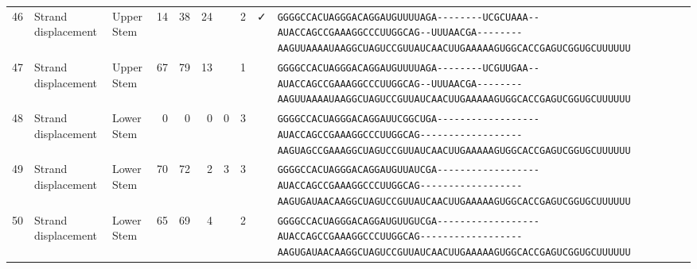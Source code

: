 \begin{tabular}{rllrrrrrcl}
 46 & Strand displacement & Upper Stem & 14 & 38 & 24 &  & 2 & ✓ &
 \color{ucsfdarkgrey}\verb|GGGGCCACUAGGGACAGGAU|\color{ucsforange}\verb|GUUUUA|\color{ucsfblue}\verb|GA--------UCGCUAAA--|\color{ucsfpurple}\verb|AUACCAGCCGAAAGGCCCUUGGCAG|\color{ucsfblue}\verb|--UUUAACGA--------AAGU|\color{ucsforange}\verb|UAAAAUAA|\color{ucsfnavy}\verb|GGCUAGUCC|\color{ucsforange}\verb|GUUAUCA|\color{ucsfteal}\verb|ACUUGAAAAAGU|\color{ucsforange}\verb|GGCACCGAGUCGGUGCUUUUUU| \\

 47 & Strand displacement & Upper Stem & 67 & 79 & 13 &  & 1 &  &
 \color{ucsfdarkgrey}\verb|GGGGCCACUAGGGACAGGAU|\color{ucsforange}\verb|GUUUUA|\color{ucsfblue}\verb|GA--------UCGUUGAA--|\color{ucsfpurple}\verb|AUACCAGCCGAAAGGCCCUUGGCAG|\color{ucsfblue}\verb|--UUUAACGA--------AAGU|\color{ucsforange}\verb|UAAAAUAA|\color{ucsfnavy}\verb|GGCUAGUCC|\color{ucsforange}\verb|GUUAUCA|\color{ucsfteal}\verb|ACUUGAAAAAGU|\color{ucsforange}\verb|GGCACCGAGUCGGUGCUUUUUU| \\

 48 & Strand displacement & Lower Stem & 0 & 0 & 0 & 0 & 3 &  &
 \color{ucsfdarkgrey}\verb|GGGGCCACUAGGGACAGGAU|\color{ucsforange}\verb|UCGGCU|\color{ucsfblue}\verb|GA------------------|\color{ucsfpurple}\verb|AUACCAGCCGAAAGGCCCUUGGCAG|\color{ucsfblue}\verb|------------------AAGU|\color{ucsforange}\verb|AGCCGAAA|\color{ucsfnavy}\verb|GGCUAGUCC|\color{ucsforange}\verb|GUUAUCA|\color{ucsfteal}\verb|ACUUGAAAAAGU|\color{ucsforange}\verb|GGCACCGAGUCGGUGCUUUUUU| \\

 49 & Strand displacement & Lower Stem & 70 & 72 & 2 & 3 & 3 &  &
 \color{ucsfdarkgrey}\verb|GGGGCCACUAGGGACAGGAU|\color{ucsforange}\verb|GUUAUC|\color{ucsfblue}\verb|GA------------------|\color{ucsfpurple}\verb|AUACCAGCCGAAAGGCCCUUGGCAG|\color{ucsfblue}\verb|------------------AAGU|\color{ucsforange}\verb|GAUAACAA|\color{ucsfnavy}\verb|GGCUAGUCC|\color{ucsforange}\verb|GUUAUCA|\color{ucsfteal}\verb|ACUUGAAAAAGU|\color{ucsforange}\verb|GGCACCGAGUCGGUGCUUUUUU| \\

 50 & Strand displacement & Lower Stem & 65 & 69 & 4 &  & 2 &  &
 \color{ucsfdarkgrey}\verb|GGGGCCACUAGGGACAGGAU|\color{ucsforange}\verb|GUUGUC|\color{ucsfblue}\verb|GA------------------|\color{ucsfpurple}\verb|AUACCAGCCGAAAGGCCCUUGGCAG|\color{ucsfblue}\verb|------------------AAGU|\color{ucsforange}\verb|GAUAACAA|\color{ucsfnavy}\verb|GGCUAGUCC|\color{ucsforange}\verb|GUUAUCA|\color{ucsfteal}\verb|ACUUGAAAAAGU|\color{ucsforange}\verb|GGCACCGAGUCGGUGCUUUUUU| \\


\end{tabular}
